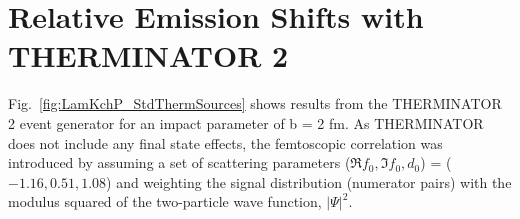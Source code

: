 \documentclass[ALICE,manyauthors]{cernphprep}
\newcommand{\ResultsDirBase}{/home/jesse/Analysis/FemtoAnalysis/Results/}
\newcommand{\Lam}{$\Lambda$\xspace}
\newcommand{\LamKchP}{$\Lambda\mathrm{K^{+}}$\xspace}
\begin{document}
\begin{comment}
\section{Spherical Harmonic Decomposition}
\label{app:SphericalHarmonics}


In Fig.\ \ref{fig:LamKchP_ReC00C11_0010} results are shown for the $C_{00}$ and $\Re C_{11}$ components from the spherical decomposition of our \LamKchP system in the 0--10\% centrality bin.
As seen in the figure, the $C_{00}$ signal is similar to that observed in the one-dimensional study.
The $\Re C_{11}$ component shows a clear deviation from zero, and the negative value signifies that the \Lam particles are, on average, emitted further out and/or earlier than the K mesons.


\begin{figure}[h!]
  \centering
  \texttt{[image: \\ResultsDirBase Results\_cLamcKch\_20181205/SphericalHarmonics/LamKchP/CanCfYlmReC00C11\_LamKchPALamKchM\_0010.pdf]}
  \caption[\LamKchP $C_{00}$ and $\Re C_{11}$ Spherical Harmonic Components (0--10\%)]{$C_{00}$ (left) and $\Re C_{11}$ (right) components of a spherical harmonic decomposition of the \LamKchP correlation function for the 0--10\% centrality bin.  
The $C_{00}$ component is similar to the 1D correlation functions typically studied, and probes the overall size of the source.
The $\Re C_{11}$ component probes the asymmetry in the system; a non-zero value reveals the asymmetry}
  \label{fig:LamKchP_ReC00C11_0010}
\end{figure}
\end{comment}

\section{Relative Emission Shifts with THERMINATOR 2}
\label{App:THERM}

Fig.\ \ref{fig:LamKchP_StdThermSources} shows results from the THERMINATOR 2 event generator for an impact parameter of b = 2 fm.
As THERMINATOR does not include any final state effects, the femtoscopic correlation was introduced by assuming a set of scattering parameters ($\Re f_{0}, \Im f_{0}, d_{0}$) = ($-1.16, 0.51, 1.08$) and weighting the signal distribution (numerator pairs) with the modulus squared of the two-particle wave function, $|\Psi|^{2}$.
\end{document}
